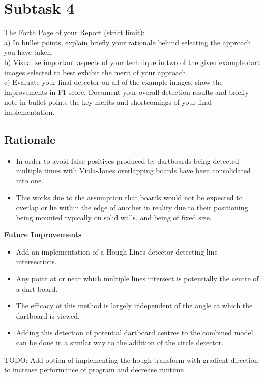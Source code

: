\documentclass[conference]{IEEEtran}
\begin{document}
\newpage
\section{Subtask 4}



The Forth Page of your Report (strict limit):\\
a) In bullet points, explain briefly your rationale behind
selecting the approach you have taken.\\
b) Visualize important aspects of your technique in two of
the given example dart images selected to best exhibit the
merit of your approach.\\
c) Evaluate your final detector on all of the example images,
show the improvements in F1-score. Document your
overall detection results and briefly note in bullet points
the key merits and shortcomings of your final
implementation.

\subsection{Rationale}
\begin{itemize}
	\item In order to avoid false positives produced by dartboards being detected multiple times with Viola-Jones overlapping boards have been consolidated into one.
	\item This works due to the assumption that boards would not be expected to overlap or lie within the edge of another in reality due to their positioning being mounted typically on solid walls, and being of fixed size.
\end{itemize}

\textbf{Future Improvements}
\begin{itemize}
	\item Add an implementation of a Hough Lines detector detecting line intersections. 
	\item Any point at or near which multiple lines intersect is potentially the centre of a dart board.
	\item The efficacy of this method is largely independent of the angle at which the dartboard is viewed.
	\item Adding this detection of potential dartboard centres to the combined model can be done in a similar way to the addition of the circle detector.
\end{itemize}

TODO: Add option of implementing the hough transform with gradient direction to increase performance of program and decrease runtime
\end{document}

